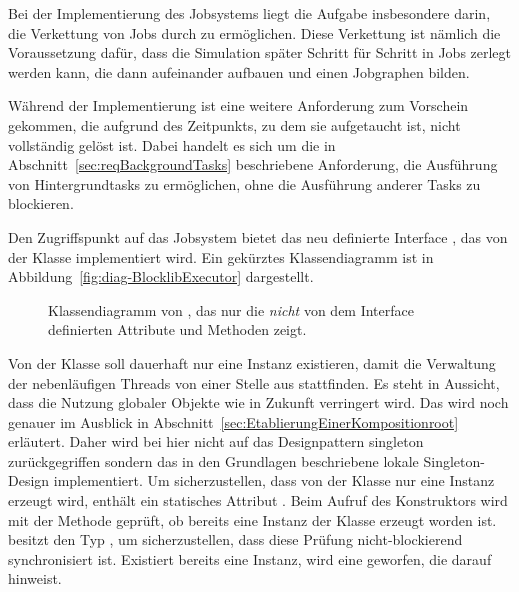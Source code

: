Bei der Implementierung des Jobsystems liegt die Aufgabe insbesondere darin, die Verkettung von Jobs durch  zu ermöglichen. Diese Verkettung ist nämlich die Voraussetzung dafür, dass die Simulation später Schritt für Schritt in Jobs zerlegt werden kann, die dann aufeinander aufbauen und einen Jobgraphen bilden. 

Während der Implementierung ist eine weitere Anforderung zum Vorschein gekommen, die aufgrund des Zeitpunkts, zu dem sie aufgetaucht ist, nicht vollständig gelöst ist. Dabei handelt es sich um die in Abschnitt~\ref{sec:reqBackgroundTasks} beschriebene Anforderung, die Ausführung von Hintergrundtasks zu ermöglichen, ohne die Ausführung anderer Tasks zu blockieren. 

Den Zugriffspunkt auf das Jobsystem bietet das neu definierte Interface , das von der Klasse  implementiert wird. Ein gekürztes Klassendiagramm ist in Abbildung~\vref{fig:diag-BlocklibExecutor} dargestellt.

\begin{figure}[!htb]
	\centering
	
	\caption[Gekürztes Klassendiagramm von .]{Klassendiagramm von , das nur die \emph{nicht} von dem Interface  definierten Attribute und Methoden zeigt.}\label{fig:diag-BlocklibExecutor}
\end{figure}

Von der Klasse  soll dauerhaft nur eine Instanz existieren, damit die Verwaltung der nebenläufigen Threads von einer Stelle aus stattfinden. Es steht in Aussicht, dass die Nutzung globaler Objekte wie  in Zukunft verringert wird. Das wird noch genauer im Ausblick in Abschnitt~\vref{sec:EtablierungEinerKompositionroot} erläutert. Daher wird bei hier nicht auf das Designpattern \gls{singleton} zurückgegriffen sondern das in den Grundlagen beschriebene lokale Singleton-Design implementiert. Um sicherzustellen, dass von der Klasse nur eine Instanz erzeugt wird, enthält  ein statisches Attribut . Beim Aufruf des Konstruktors wird mit der Methode  geprüft, ob bereits eine Instanz der Klasse erzeugt worden ist.  besitzt den Typ , um sicherzustellen, dass diese Prüfung nicht-blockierend synchronisiert ist. Existiert bereits eine Instanz, wird eine  geworfen, die darauf hinweist.

